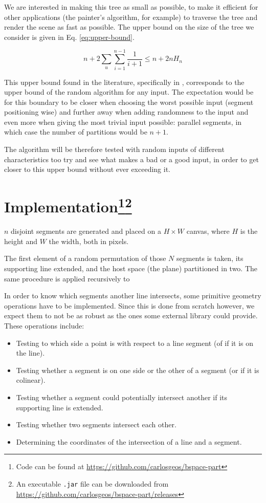 \documentclass[12pt,a4paper]{article}
\begin{document}
We are interested in making this tree as small as possible, to make it
efficient for other applications (the painter's algorithm, for
example) to traverse the tree and render the scene as fast as
possible. The upper bound on the size of the tree we consider is given
in Eq. \ref{eq:upper-bound}.

\begin{equation}
  \label{eq:upper-bound}
  n + 2 \sum_u \sum_{i=1}^{n-1} \frac{1}{i+1} \leq n + 2nH_n
\end{equation}

This upper bound found in the literature, specifically in
\cite[p.~14]{Motwani:1995:RA:211390}, corresponds to the upper bound of the
random algorithm for any input. The expectation would be for this
boundary to be closer when choosing the worst possible input (segment
positioning wise) and further away when adding randomness to the input
and even more when giving the most trivial input possible: parallel
segments, in which case the number of partitions would be $n+1$.

The algorithm will be therefore tested with random inputs of different
characteristics too try and see what makes a bad or a good input, in
order to get closer to this upper bound without ever exceeding it.

\section[Implementation]{Implementation\footnote{Code can be found at
    \url{https://github.com/carlosgeos/bspace-part}}\footnote{An
    executable \texttt{.jar} file can be downloaded from
    \url{https://github.com/carlosgeos/bspace-part/releases}}}

$n$ disjoint segments are generated and placed on a $H\times W$
canvas, where $H$ is the height and $W$ the width, both in pixels.

The first element of a random permutation of those $N$ segments is
taken, its supporting line extended, and the host space (the plane)
partitioned in two. The same procedure is applied recursively to

In order to know which segments another line intersects, some
primitive geometry operations have to be implemented. Since this is
done from scratch however, we expect them to not be as robust as the
ones some external library could provide. These operations include:

\begin{itemize}
\item Testing to which side a point is with respect to a line segment
  (of if it is on the line).
\item Testing whether a segment is on one side or the other of a
  segment (or if it is colinear).
\item Testing whether a segment could potentially intersect another if
  its supporting line is extended.
\item Testing whether two segments intersect each other.
\item Determining the coordinates of the intersection of a line and a
  segment.
\end{itemize}
\end{document}
